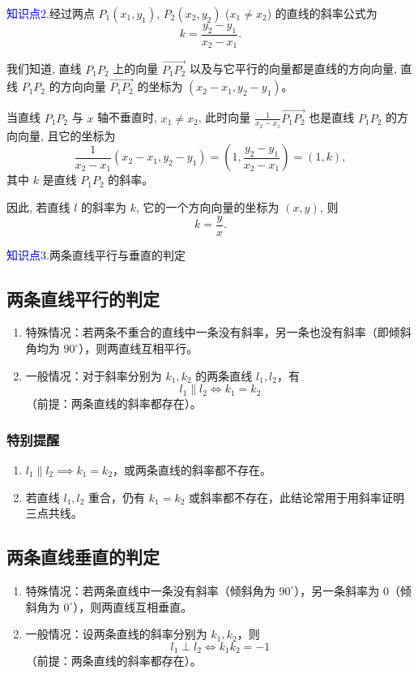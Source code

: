 \documentclass{article}
\begin{document}
\textcolor{blue}{知识点2.}经过两点 \(P_1(x_1, y_1)\), \(P_2(x_2, y_2)\) (\(x_1 \neq x_2\)) 的直线的斜率公式为
\[
k = \frac{y_2 - y_1}{x_2 - x_1}.
\]

\begin{tcolorbox}[colback=blue!10,colframe=blue!70!black,title=]
我们知道, 直线 \(P_1P_2\) 上的向量 \(\overrightarrow{P_1P_2}\) 以及与它平行的向量都是直线的方向向量, 直线 \(P_1P_2\) 的方向向量 \(\overrightarrow{P_1P_2}\) 的坐标为 \((x_2 - x_1, y_2 - y_1)\)。

当直线 \(P_1P_2\) 与 \(x\) 轴不垂直时, \(x_1 \neq x_2\), 此时向量 \(\frac{1}{x_2 - x_1}\overrightarrow{P_1P_2}\) 也是直线 \(P_1P_2\) 的方向向量, 且它的坐标为
\[
\frac{1}{x_2 - x_1}(x_2 - x_1, y_2 - y_1) = \left(1, \frac{y_2 - y_1}{x_2 - x_1}\right) = (1, k),
\]
其中 \(k\) 是直线 \(P_1P_2\) 的斜率。

因此, 若直线 \(l\) 的斜率为 \(k\), 它的一个方向向量的坐标为 \((x, y)\), 则
\[
k = \frac{y}{x}.
\]
\end{tcolorbox}
\vspace{1\baselineskip}

\textcolor{blue}{知识点3.}两条直线平行与垂直的判定

\subsection*{两条直线平行的判定}
\begin{enumerate}
    \item 特殊情况：若两条不重合的直线中一条没有斜率，另一条也没有斜率（即倾斜角均为 \(90^\circ\)），则两直线互相平行。
    \item 一般情况：对于斜率分别为 \(k_1, k_2\) 的两条直线 \(l_1, l_2\)，有
    \[
    l_1 \parallel l_2 \iff k_1 = k_2
    \]
    （前提：两条直线的斜率都存在）。
\end{enumerate}

\subsubsection*{特别提醒}
\begin{enumerate}
    \item \(l_1 \parallel l_2 \implies k_1 = k_2\)，或两条直线的斜率都不存在。
    \item 若直线 \(l_1, l_2\) 重合，仍有 \(k_1 = k_2\) 或斜率都不存在，此结论常用于用斜率证明三点共线。
\end{enumerate}

\subsection*{两条直线垂直的判定}
\begin{enumerate}
    \item 特殊情况：若两条直线中一条没有斜率（倾斜角为 \(90^\circ\)），另一条斜率为 \(0\)（倾斜角为 \(0^\circ\)），则两直线互相垂直。
    \item 一般情况：设两条直线的斜率分别为 \(k_1, k_2\)，则
    \[
    l_1 \perp l_2 \iff k_1 k_2 = -1
    \]
    （前提：两条直线的斜率都存在）。
\end{enumerate}
\vspace{1\baselineskip}
\end{document}
